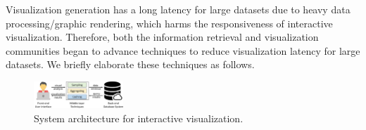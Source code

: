 



 Visualization generation has a long latency for large datasets due to heavy data processing/graphic rendering, which harms the responsiveness of interactive visualization. Therefore, both the information retrieval and visualization communities began to advance techniques to reduce visualization latency for large datasets. We briefly elaborate these techniques as follows.

\begin{figure}
	\centering
	\includegraphics[width=0.3\textwidth]{pictures/framework/framework.pdf}
	\trim
	\caption{System architecture for interactive visualization.} \label{fig:sys_framework}
    \trim \trim
\end{figure}
\fi

